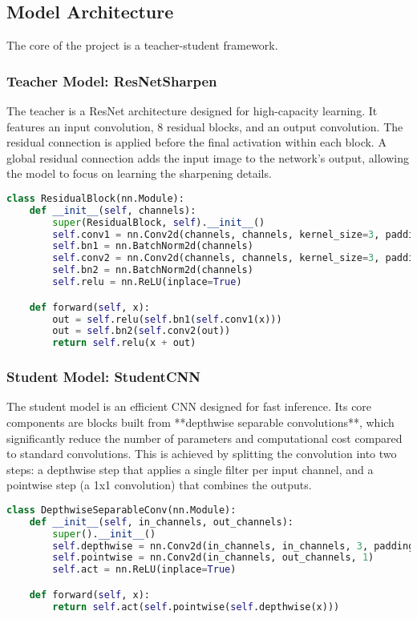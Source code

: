 \documentclass[12pt,a4paper]{article}
\begin{document}
\subsection{Model Architecture}
The core of the project is a teacher-student framework.

\subsubsection{Teacher Model: ResNetSharpen}
The teacher is a ResNet architecture designed for high-capacity learning. It features an input convolution, 8 residual blocks, and an output convolution. The residual connection is applied before the final activation within each block. A global residual connection adds the input image to the network's output, allowing the model to focus on learning the sharpening details.

\begin{lstlisting}[language=Python, caption={Updated ResidualBlock for Teacher Model}]
class ResidualBlock(nn.Module):
    def __init__(self, channels):
        super(ResidualBlock, self).__init__()
        self.conv1 = nn.Conv2d(channels, channels, kernel_size=3, padding=1)
        self.bn1 = nn.BatchNorm2d(channels)
        self.conv2 = nn.Conv2d(channels, channels, kernel_size=3, padding=1)
        self.bn2 = nn.BatchNorm2d(channels)
        self.relu = nn.ReLU(inplace=True)

    def forward(self, x):
        out = self.relu(self.bn1(self.conv1(x)))
        out = self.bn2(self.conv2(out))
        return self.relu(x + out)
\end{lstlisting}

\subsubsection{Student Model: StudentCNN}
The student model is an efficient CNN designed for fast inference. Its core components are blocks built from **depthwise separable convolutions**, which significantly reduce the number of parameters and computational cost compared to standard convolutions. This is achieved by splitting the convolution into two steps: a depthwise step that applies a single filter per input channel, and a pointwise step (a 1x1 convolution) that combines the outputs.

\begin{lstlisting}[language=Python, caption={Depthwise Separable Convolution Module}]
class DepthwiseSeparableConv(nn.Module):
    def __init__(self, in_channels, out_channels):
        super().__init__()
        self.depthwise = nn.Conv2d(in_channels, in_channels, 3, padding=1, groups=in_channels)
        self.pointwise = nn.Conv2d(in_channels, out_channels, 1)
        self.act = nn.ReLU(inplace=True)

    def forward(self, x):
        return self.act(self.pointwise(self.depthwise(x)))
\end{lstlisting}
\end{document}

